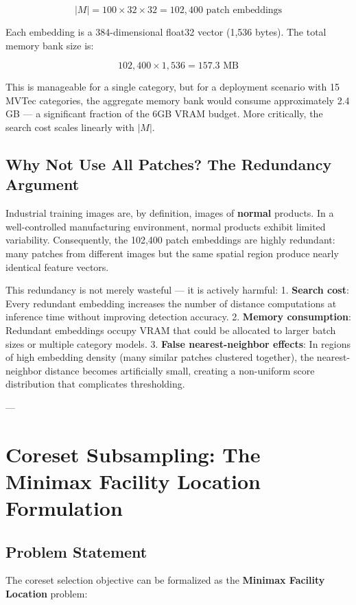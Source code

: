 \documentclass[12pt,a4paper,oneside]{report}
\begin{document}
$$|M| = 100 \times 32 \times 32 = 102{,}400 \text{ patch embeddings}$$

Each embedding is a 384-dimensional float32 vector (1,536 bytes). The total memory bank size is:

$$102{,}400 \times 1{,}536 = 157.3 \text{ MB}$$

This is manageable for a single category, but for a deployment scenario with 15 MVTec categories, the aggregate memory bank would consume approximately 2.4 GB --- a significant fraction of the 6GB VRAM budget. More critically, the search cost scales linearly with $|M|$.

\subsection{Why Not Use All Patches? The Redundancy Argument}

Industrial training images are, by definition, images of \textbf{normal} products. In a well-controlled manufacturing environment, normal products exhibit limited variability. Consequently, the 102,400 patch embeddings are highly redundant: many patches from different images but the same spatial region produce nearly identical feature vectors.

This redundancy is not merely wasteful --- it is actively harmful:
1. \textbf{Search cost}: Every redundant embedding increases the number of distance computations at inference time without improving detection accuracy.
2. \textbf{Memory consumption}: Redundant embeddings occupy VRAM that could be allocated to larger batch sizes or multiple category models.
3. \textbf{False nearest-neighbor effects}: In regions of high embedding density (many similar patches clustered together), the nearest-neighbor distance becomes artificially small, creating a non-uniform score distribution that complicates thresholding.

---

\section{Coreset Subsampling: The Minimax Facility Location Formulation}

\subsection{Problem Statement}

The coreset selection objective can be formalized as the \textbf{Minimax Facility Location} problem:
\end{document}
